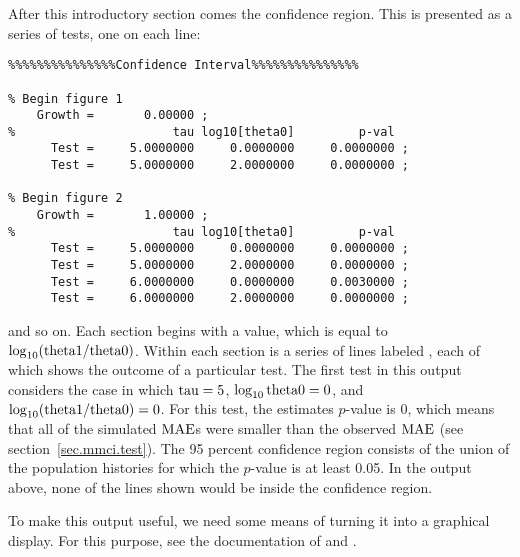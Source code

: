 After this introductory section comes the confidence region.  This is
presented as a series of tests, one on each line:
\begin{verbatim}
%%%%%%%%%%%%%%%Confidence Interval%%%%%%%%%%%%%%%

% Begin figure 1
    Growth =       0.00000 ;
%                      tau log10[theta0]         p-val
      Test =     5.0000000     0.0000000     0.0000000 ;
      Test =     5.0000000     2.0000000     0.0000000 ;

% Begin figure 2
    Growth =       1.00000 ;
%                      tau log10[theta0]         p-val
      Test =     5.0000000     0.0000000     0.0000000 ;
      Test =     5.0000000     2.0000000     0.0000000 ;
      Test =     6.0000000     0.0000000     0.0030000 ;
      Test =     6.0000000     2.0000000     0.0000000 ;
\end{verbatim}
and so on.  Each section begins with a  value, which is
equal to $\log_{10} (\hbox{theta1}/\hbox{theta0})$.  Within each section is a series
of lines labeled , each of which shows the outcome of a
particular test.  The first test in this output considers the case in
which $\hbox{tau}=5$, $\log_{10} \hbox{theta0} = 0$, and $\log_{10} (\hbox{theta1}/\hbox{theta0})=0$.
For this test, the estimates $p$-value is 0, which means that all of
the simulated $\hbox{MAE}$s were smaller than the observed $\hbox{MAE}$ (see
section~\ref{sec.mmci.test}).  The 95 percent confidence region
consists of the union of the population histories for which the
$p$-value is at least 0.05.  In the output above, none of the lines
shown would be inside the confidence region.

To make this output useful, we need some means of turning it into a
graphical display.  For this purpose, see the documentation of
 and . 


